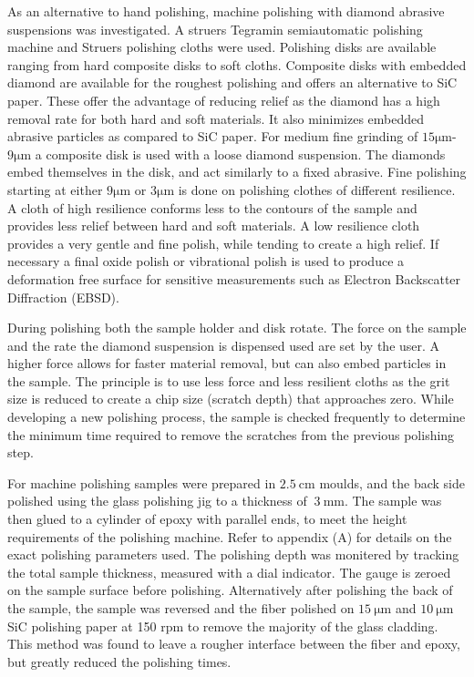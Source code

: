 As an alternative to hand polishing, machine polishing with diamond abrasive suspensions was investigated.  A struers Tegramin semiautomatic polishing machine and Struers polishing cloths were used. Polishing disks are available ranging from hard composite disks to soft cloths. Composite disks with embedded diamond are available for the roughest polishing and offers an alternative to SiC paper. These offer the advantage of reducing relief as the diamond has a high removal rate for both hard and soft materials. It also minimizes embedded abrasive particles as compared to SiC paper. For medium fine grinding of $15\si{\micro\meter}$-$9\si{\micro\meter}$ a composite disk is used with a loose diamond suspension. The diamonds embed themselves in the disk, and act similarly to a fixed abrasive. Fine polishing starting at either $9 \si{\micro\meter}$ or $3\si{\micro\meter}$ is done on polishing clothes of different resilience. A cloth of high resilience conforms less to the contours of the sample and provides less relief between hard and soft materials. A low resilience cloth provides a very gentle and fine polish, while tending to create a high relief. If necessary a final oxide polish or vibrational polish is used to produce a deformation free surface for sensitive measurements such as Electron Backscatter Diffraction (EBSD). 

During polishing both the sample holder and disk rotate. The force on the sample and the rate the diamond suspension is dispensed used are set by the user. A higher force allows for faster material removal, but can also embed particles in the sample. The principle is to use less force and less resilient cloths as the grit size is reduced to create a chip size (scratch depth) that approaches zero. While developing a new polishing process, the sample is checked frequently to determine the minimum time required to remove the scratches from the previous polishing step. 

For machine polishing samples were prepared in $\SI{2.5}{\cm}$ moulds, and the back side polished using the glass polishing jig to a thickness of $~\SI{3}{\mm}$. The sample was then glued to a cylinder of epoxy with parallel ends, to meet the height requirements of the polishing machine. Refer to appendix (A) for details on the exact polishing parameters used. The polishing depth was monitered by tracking the total sample thickness, measured with a dial indicator. The gauge is zeroed on the sample surface before polishing. Alternatively after polishing the back of the sample, the sample was reversed and the fiber polished on $\SI{15}{\micro\meter}$ and $\SI{10}{\micro\meter}$ SiC polishing paper at 150 rpm to remove the majority of the glass cladding. This method was found to leave a rougher interface between the fiber and epoxy, but greatly reduced the polishing times. 


